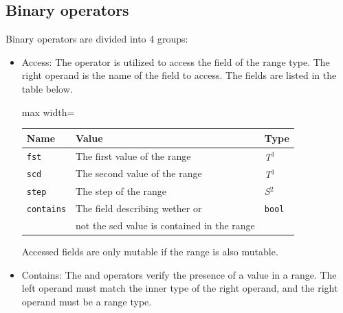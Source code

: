 \subsection {Binary operators}

Binary operators are divided into 4 groups:

\begin{itemize}
  \setlength\itemsep{-4pt}
\item Access: The operator  is utilized to access the field of the
  range type. The right operand is the name of the field to access. The fields
  are listed in the table below.

  \begin{center}\begin{adjustbox}{max width=\linewidth}
    \begin{threeparttable}
      \begin{tabular}{|l|ll|}
        \hline
        Name & Value & Type\\
        \hline
        \hline
        \texttt {fst} & The first value of the range & \textit{T}$^{1^{\phantom{j}}}$ \\
        \texttt {scd} & The second value of the range & \textit{T}$^{1^{\phantom{j}}}$ \\
        \texttt {step} & The step of the range & \textit{S}$^{2^{\phantom{j}}}$ \\
        \texttt {contains} & The field describing wether or  & \texttt{bool} \\
        & not the scd value is contained in the range &\\
        \hline
      \end{tabular}
    \end{threeparttable}
\end{adjustbox}\end{center}

Accessed fields are only mutable if the range is also mutable.

\item Contains: The  and  operators verify the presence
  of a value in a range. The left operand must match the inner type of the right
  operand, and the right operand must be a range type.


\end{itemize}
